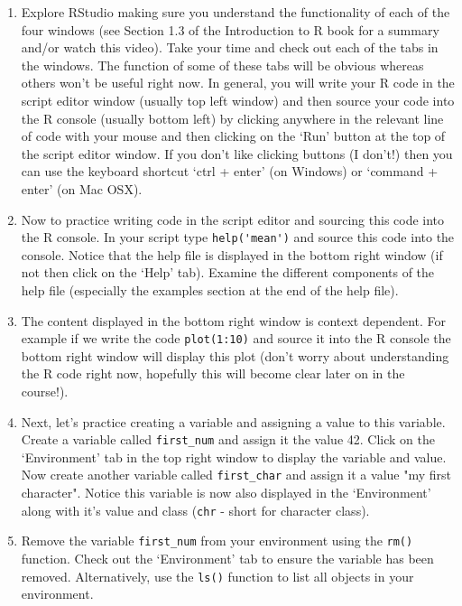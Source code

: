 \documentclass[12pt]{article}
\begin{document}
\begin{enumerate}
 

\item Explore RStudio making sure you understand the functionality of each of the four windows (see Section 1.3 of the Introduction to R book for a summary and/or watch this video). Take your time and check out each of the tabs in the windows. The function of some of these tabs will be obvious whereas others won’t be useful right now. In general, you will write your R code in the script editor window (usually top left window) and then source your code into the R console (usually bottom left) by clicking anywhere in the relevant line of code with your mouse and then clicking on the ‘Run’ button at the top of the script editor window. If you don’t like clicking buttons (I don’t!) then you can use the keyboard shortcut ‘ctrl + enter’ (on Windows) or ‘command + enter’ (on Mac OSX).

 

\item Now to practice writing code in the script editor and sourcing this code into the R console. 
 In your script type \lstinline{help('mean')} and source this code into the console. Notice that the help file is displayed in the bottom right window (if not then click on the ‘Help’ tab). Examine the different components of the help file (especially the examples section at the end of the help file). 
 

 

\item The content displayed in the bottom right window is context dependent. For example if we write the code \lstinline{plot(1:10)} and source it into the R console the bottom right window will display this plot (don’t worry about understanding the R code right now, hopefully this will become clear later on in the course!).

 

\item Next, let’s practice creating a variable and assigning a value to this variable. 
Create a variable called \verb|first_num| and assign it the value 42. Click on the ‘Environment’ tab in the top right window to display the variable and value. Now create another variable called \lstinline{first_char} and assign it a value "my first character". Notice this variable is now also displayed in the ‘Environment’ along with it’s value and class (\lstinline{chr} - short for character class).

 

\item Remove the variable \lstinline{first_num} from your environment using the \lstinline{rm()} function. Check out the ‘Environment’ tab to ensure the variable has been removed. Alternatively, use the \lstinline{ls()} function to list all objects in your environment.


\end{enumerate}
\end{document}
